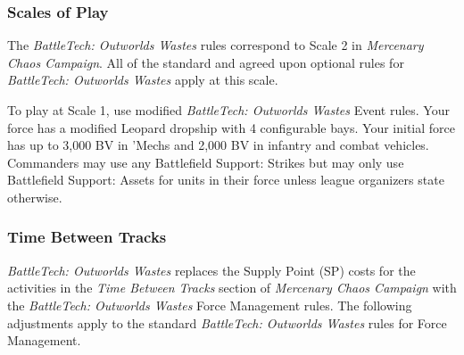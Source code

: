 \subsubsection{Scales of Play}

The \emph{BattleTech: Outworlds Wastes} rules correspond to Scale 2 in \emph{Mercenary Chaos Campaign}.
All of the standard and agreed upon optional rules for \emph{BattleTech: Outworlds Wastes} apply at this scale.

To play at Scale 1, use modified \emph{BattleTech: Outworlds Wastes} Event rules.
Your force has a modified Leopard dropship with 4 configurable bays.
Your initial force has up to 3,000 BV in 'Mechs and 2,000 BV in infantry and combat vehicles.
Commanders may use any Battlefield Support: Strikes but may only use Battlefield Support: Assets for units in their force unless league organizers state otherwise.

\subsubsection{Time Between Tracks}

\emph{BattleTech: Outworlds Wastes} replaces the Supply Point (SP) costs for the activities in the \emph{Time Between Tracks} section of \emph{Mercenary Chaos Campaign} with the \emph{BattleTech: Outworlds Wastes} Force Management rules.
The following adjustments apply to the standard \emph{BattleTech: Outworlds Wastes} rules for Force Management.

